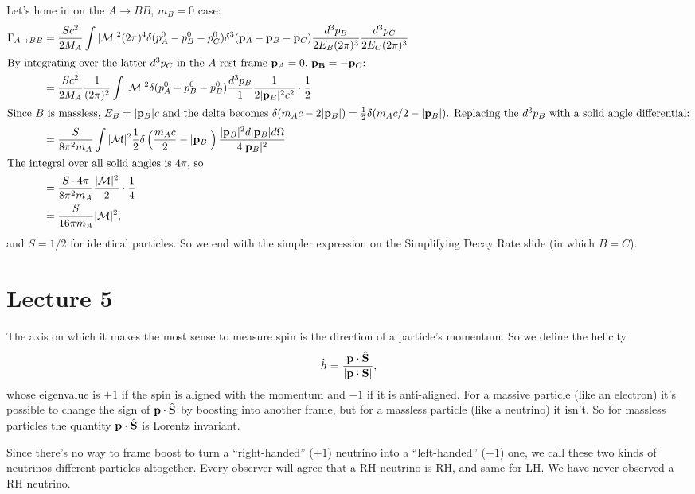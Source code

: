 \documentclass[../p164main.tex]{subfiles}
\begin{document}
Let's hone in on the $A \to BB$, $m_B = 0$ case:
\begin{align*}
    \Gamma_{A \to BB} &= \frac{Sc^2}{2 M_A} \int |\mathcal M|^2 (2\pi)^{4} \delta(p_A^0 - p_B^0 - p_C^0) \delta^3(\mathbf{p}_A - \mathbf{p}_B - \mathbf{p}_C) \frac{d^3 p_B}{2 E_B (2\pi)^3} \frac{d^3 p_C}{2E_C (2\pi)^3} \\
    \intertext{By integrating over the latter $d^3 p_C$ in the $A$ rest frame $\mathbf{p}_A = 0$, $\mathbf{p_B} = -\mathbf{p}_C$:}
    &= \frac{Sc^2}{2 M_A} \frac{1}{(2\pi)^2} \int |\mathcal M|^2 \delta(p_A^0 - p_B^0 - p_B^0) \frac{d^3 p_B}{1} \frac{1}{2|\mathbf{p}_B|^2 c^2} \cdot \frac{1}{2} \\
    \intertext{Since $B$ is massless, $E_B = |\mathbf{p}_B| c$ and the delta becomes $\delta(m_A c - 2|\mathbf{p}_B|) = \frac{1}{2} \delta(m_A c / 2 - |\mathbf{p}_B|)$. Replacing the $d^3 p_B$ with a solid angle differential:}
    &= \frac{S}{8\pi^2 m_A} \int |\mathcal M|^2 \frac{1}{2} \delta \left( \frac{m_A c}{2} - |\mathbf{p}_B| \right) \frac{|\mathbf{p}_B|^2 d|\mathbf{p}_B| d\Omega}{4|\mathbf{p}_B|^2} \\
    \intertext{The integral over all solid angles is $4\pi$, so}
    &= \frac{S \cdot 4\pi}{8\pi^2 m_A} \frac{|\mathcal M|^2}{2} \cdot \frac{1}{4} \\
    &= \frac{S}{16\pi m_A} |\mathcal M|^2,
\end{align*}
and $S = 1 / 2$ for identical particles.
So we end with the simpler expression on the Simplifying Decay Rate slide (in which $B = C$).


\section{Lecture 5}
The axis on which it makes the most sense to measure spin is the direction of a particle's momentum.
So we define the helicity
\[ \hat h = \frac{\mathbf{p} \cdot \hat{\mathbf{S}}}{|\mathbf{p} \cdot \mathbf{S}|}, \]
whose eigenvalue is $+1$ if the spin is aligned with the momentum and $-1$ if it is anti-aligned.
For a massive particle (like an electron) it's possible to change the sign of $\mathbf{p} \cdot \hat{\mathbf{S}}$ by boosting into another frame, but for a massless particle (like a neutrino) it isn't.
So for massless particles the quantity $\mathbf{p} \cdot \hat{\mathbf{S}}$ is Lorentz invariant.

Since there's no way to frame boost to turn a ``right-handed'' ($+1$) neutrino into a ``left-handed'' ($-1$) one, we call these two kinds of neutrinos different particles altogether.
Every observer will agree that a RH neutrino is RH, and same for LH.
We have never observed a RH neutrino.
\end{document}

